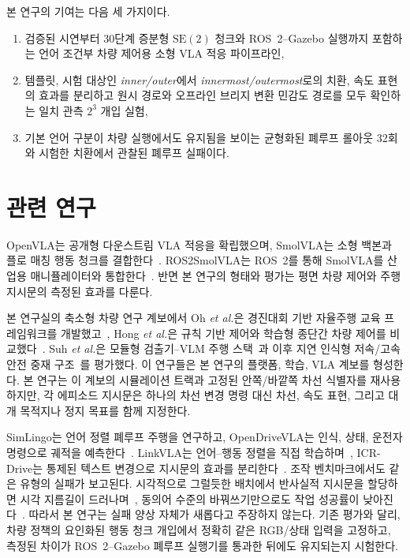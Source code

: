 \documentclass[letterpaper,conference]{IEEEtran}
\newcommand{\seTwo}{\mathrm{SE}(2)}
\begin{document}
본 연구의 기여는 다음 세 가지이다.
\begin{enumerate}
    \item 검증된 시연부터 30단계 증분형 $\seTwo$ 청크와 ROS~2--Gazebo 실행까지
    포함하는 언어 조건부 차량 제어용 소형 VLA 적응 파이프라인,
    \item 템플릿, 시험 대상인 \emph{inner/outer}에서
    \emph{innermost/outermost}로의 치환, 속도 표현의 효과를 분리하고 원시 경로와
    오프라인 브리지 변환 민감도 경로를 모두 확인하는 일치 관측 $2^3$ 개입 실험,
    \item 기본 언어 구분이 차량 실행에서도 유지됨을 보이는 균형화된 폐루프 롤아웃
    32회와 시험한 치환에서 관찰된 폐루프 실패이다.
\end{enumerate}

\section{관련 연구}
OpenVLA는 공개형 다운스트림 VLA 적응을 확립했으며, SmolVLA는 소형 백본과 플로
매칭 행동 청크를 결합한다~\cite{openvla,smolvla}. ROS2SmolVLA는 ROS~2를 통해
SmolVLA를 산업용 매니퓰레이터와 통합한다~\cite{ros2smolvla}. 반면 본 연구의 형태와
평가는 평면 차량 제어와 주행 지시문의 측정된 효과를 다룬다.

본 연구실의 축소형 차량 연구 계보에서 Oh \emph{et al.}은 경진대회 기반 자율주행
교육 프레임워크를 개발했고~\cite{oh2026education}, Hong \emph{et al.}은 규칙 기반
제어와 학습형 종단간 차량 제어를 비교했다~\cite{hong2025datadriven}. Suh
\emph{et al.}은 모듈형 검출기--VLM 주행 스택~\cite{suh2025modularvla}과 이후
지연 인식형 저속/고속 안전 중재 구조~\cite{suh2026lasa}를 평가했다. 이 연구들은
본 연구의 플랫폼, 학습, VLA 계보를 형성한다. 본 연구는 이 계보의 시뮬레이션 트랙과
고정된 안쪽/바깥쪽 차선 식별자를 재사용하지만, 각 에피소드 지시문은 하나의 차선 변경
명령 대신 차선, 속도 표현, 그리고 대개 목적지나 정지 목표를 함께 지정한다.

SimLingo는 언어 정렬 폐루프 주행을 연구하고, OpenDriveVLA는 인식, 상태, 운전자
명령으로 궤적을 예측한다~\cite{simlingo,opendrivevla}. LinkVLA는 언어--행동 정렬을
직접 학습하며~\cite{linkvla}, ICR-Drive는 통제된 텍스트 변경으로 지시문의 효과를
분리한다~\cite{icrdrive}. 조작 벤치마크에서도 같은 유형의 실패가 보고된다. 시각적으로
그럴듯한 배치에서 반사실적 지시문을 할당하면 시각 지름길이 드러나며~\cite{liberocf},
동의어 수준의 바꿔쓰기만으로도 작업 성공률이 낮아진다~\cite{liberopara}. 따라서 본
연구는 실패 양상 자체가 새롭다고 주장하지 않는다. 기존 평가와 달리, 차량 정책의
요인화된 행동 청크 개입에서 정확히 같은 RGB/상태 입력을 고정하고, 측정된 차이가
ROS~2--Gazebo 폐루프 실행기를 통과한 뒤에도 유지되는지 시험한다.
\end{document}
